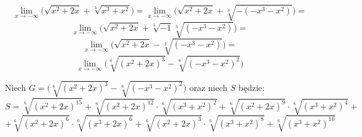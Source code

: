 \documentclass{article}
\begin{document}
\begin{equation*}
    \lim_{x \to - \infty} \Big(\sqrt{x^2 +2x} + \sqrt[3]{x^3 + x^2}\Big) = \lim_{x \to - \infty} \Big(\sqrt{x^2 + 2x} + \sqrt[3]{- (-x^3 - x^2)}\Big) = 
\end{equation*}
\begin{equation*}
    \lim_{x \to - \infty} \Big(\sqrt{x^2 + 2x} + \sqrt[3]{-1}\sqrt[3]{(-x^3 - x^2)}\Big) = 
\end{equation*}
\begin{equation*}
    \lim_{x \to - \infty} \Big(\sqrt{x^2 + 2x} - \sqrt[3]{(-x^3 - x^2)}\Big) = 
\end{equation*}
\begin{equation*}
    \lim_{x \to - \infty} \Big(\sqrt[6]{(x^2 + 2x)^{3}} - \sqrt[6]{(-x^3 - x^2)^{2}}\Big) 
\end{equation*}


Niech \(G = \Big(\sqrt[6]{(x^2 + 2x)^{3}} - \sqrt[6]{(-x^3 - x^2)^{2}}\Big)\) oraz  niech \(S\) będzie:
\begin{equation*}
    S = \sqrt[6]{(x^2 +2x)^{15}} + \sqrt[6]{(x^2 +2x)^{12}} \cdot \sqrt[6]{(x^3 + x^2)^{2}} + \sqrt[6]{(x^2 + 2x)^{9}} \cdot \sqrt[6]{(x^3 + x^2)^{4}} +
\end{equation*}
\begin{equation*}
    + \sqrt[6]{(x^2 +2x)^{6}} \cdot \sqrt[6]{(x^3 + 2x)^{6}} + \sqrt[6]{(x^2 + 2x)^{3}} \cdot \sqrt[6]{(x^3 + x^2)^{8}} + \sqrt[6]{(x^3 + x^2)^{10}}
\end{equation*}
\end{document}
